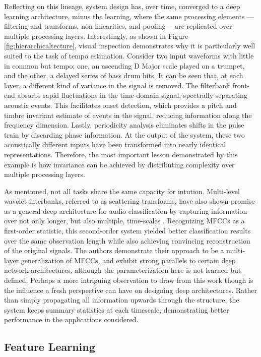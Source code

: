 Reflecting on this lineage, system design has, over time, converged to a deep learning architecture, minus the learning, where the same processing elements ---filtering and transforms, non-linearities, and pooling--- are replicated over multiple processing layers.
Interestingly, as shown in Figure \ref{fig:hierarchicaltecture}, visual inspection demonstrates why it is particularly well suited to the task of tempo estimation.
Consider two input waveforms with little in common but tempo; one, an ascending D Major scale played on a trumpet, and the other, a delayed series of bass drum hits.
It can be seen that, at each layer, a different kind of variance in the signal is removed.
The filterbank front-end absorbs rapid fluctuations in the time-domain signal, spectrally separating acoustic events.
This facilitates onset detection, which provides a pitch and timbre invariant estimate of events in the signal, reducing information along the frequency dimension.
Lastly, periodicity analysis eliminates shifts in the pulse train by discarding phase information.
At the output of the system, these two acoustically different inputs have been transformed into nearly identical representations.
Therefore, the most important lesson demonstrated by this example is how invariance can be achieved by distributing complexity over multiple processing layers.

As mentioned, not all tasks share the same capacity for intution.
Multi-level wavelet filterbanks, referred to as scattering transforms, have also shown promise as a general deep architecture for audio classification by capturing information over not only longer, but also multiple, time-scales \cite{Anden2011}.
Recognizing MFCCs as a first-order statistic, this second-order system yielded better classification results over the same observation length while also achieving convincing reconstruction of the original signals.
The authors demonstrate their approach to be a multi-layer generalization of MFCCs, and exhibit strong parallels to certain deep network architectures, although the parameterization here is not learned but defined.
Perhaps a more intriguing observation to draw from this work though is the influence a fresh perspective can have on designing deep architectures.
Rather than simply propagating all information upwards through the structure, the system keeps summary statistics at each timescale, demonstrating better performance in the applications considered.


\subsection{Feature Learning}
\label{subsec:feature_learning}


